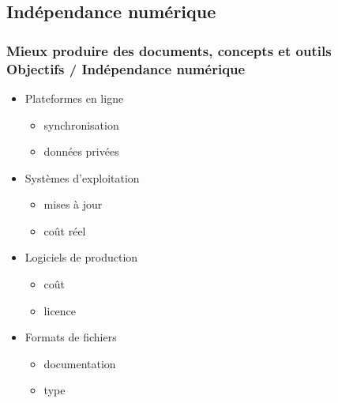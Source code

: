 \documentclass{beamer}
\def\hititle{Mieux produire des documents}
\def\lotitle{concepts et outils}
\def\fulltitle{\hititle, \lotitle}
\begin{document}
\subsection{Indépendance numérique}
\begin{frame}
\frametitle{\fulltitle\\Objectifs / Indépendance numérique}
\begin{itemize}
\item<1-> Plateformes en ligne
    \begin{itemize}
    \item<2-> synchronisation
    \item<3-> données privées
    \end{itemize}
\item<4-> Systèmes d’exploitation
    \begin{itemize}
    \item<5-> mises à jour
    \item<6-> coût réel
    \end{itemize}
\item<7-> Logiciels de production
    \begin{itemize}
    \item<8-> coût
    \item<9-> licence
    \end{itemize}
\item<10-> Formats de fichiers
    \begin{itemize}
    \item<11-> documentation
    \item<12-> type
    \end{itemize}
\end{itemize}
\end{frame}
\end{document}
